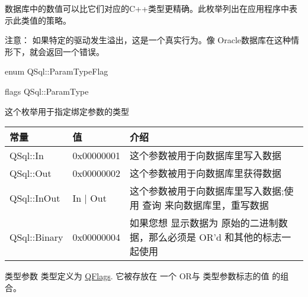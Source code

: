 数据库中的数值可以比它们对应的C++类型更精确。此枚举列出在应用程序中表示此类值的策略。



注意： 如果特定的驱动发生溢出，这是一个真实行为。像 Oracle数据库在这种情形下，就会返回一个错误。


enum QSql::ParamTypeFlag


flags QSql::ParamType


这个枚举用于指定绑定参数的类型

\begin{tabular}{|l|l|l|}
	\hline
		常量	& 值 & 介绍 \\
	\hline
	QSql::In&0x00000001&这个参数被用于向数据库里写入数据\\
	\hline
	QSql::Out&0x00000002&这个参数被用于向数据库里获得数据\\
	\hline
	QSql::InOut&In | Out&这个参数被用于向数据库里写入数据;使用 查询 来向数据库里，重写数据\\
	\hline
	QSql::Binary&0x00000004&如果您想 显示数据为 原始的二进制数据，那么必须是 OR'd 和其他的标志一 起使用\\
	\hline
\end{tabular}

类型参数 类型定义为 \href{https://doc.qt.io/qt-5/qflags.html}{QFlags}. 它被存放在 一个 OR与 类型参数标志的值 的组合。





